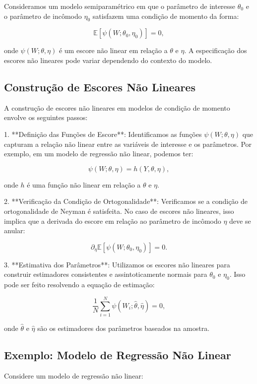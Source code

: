 \documentclass[a4paper,12pt]{article}[abntex2]
\begin{document}
Consideramos um modelo semiparamétrico em que o parâmetro de interesse $\theta_0$ e o parâmetro de incômodo $\eta_0$ satisfazem uma condição de momento da forma:

\[
\mathbb{E}[\psi(W; \theta_0, \eta_0)] = 0,
\]

onde $\psi(W; \theta, \eta)$ é um escore não linear em relação a $\theta$ e $\eta$. A especificação dos escores não lineares pode variar dependendo do contexto do modelo.

\subsection*{Construção de Escores Não Lineares}

A construção de escores não lineares em modelos de condição de momento envolve os seguintes passos:

1. **Definição das Funções de Escore**: Identificamos as funções $\psi(W; \theta, \eta)$ que capturam a relação não linear entre as variáveis de interesse e os parâmetros. Por exemplo, em um modelo de regressão não linear, podemos ter:

\[
\psi(W; \theta, \eta) = h(Y, \theta, \eta),
\]

onde $h$ é uma função não linear em relação a $\theta$ e $\eta$.

2. **Verificação da Condição de Ortogonalidade**: Verificamos se a condição de ortogonalidade de Neyman é satisfeita. No caso de escores não lineares, isso implica que a derivada do escore em relação ao parâmetro de incômodo $\eta$ deve se anular:

\[
\partial_\eta \mathbb{E}[\psi(W; \theta_0, \eta_0)] = 0.
\]

3. **Estimativa dos Parâmetros**: Utilizamos os escores não lineares para construir estimadores consistentes e assintoticamente normais para $\theta_0$ e $\eta_0$. Isso pode ser feito resolvendo a equação de estimação:

\[
\frac{1}{N} \sum_{i=1}^N \psi(W_i; \hat{\theta}, \hat{\eta}) = 0,
\]

onde $\hat{\theta}$ e $\hat{\eta}$ são os estimadores dos parâmetros baseados na amostra.

\subsection*{Exemplo: Modelo de Regressão Não Linear}

Considere um modelo de regressão não linear:
\end{document}
